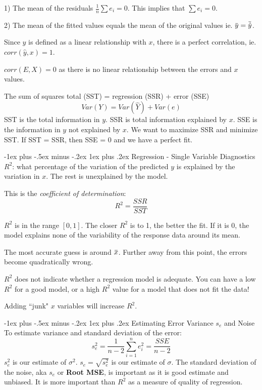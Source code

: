 \documentclass[10pt,landscape]{article}
\makeatletter
\renewcommand{\subsubsection}{\@startsection{subsubsection}{3}{0mm}%
                                {-1ex plus -.5ex minus -.2ex}%
                                {1ex plus .2ex}%
                                {\normalfont\small\bfseries}}
\newcommand{\overbar}[1]{\mkern 1.5mu\overline{\mkern-1.5mu#1\mkern-1.5mu}\mkern 1.5mu}
\makeatother
\begin{document}
\begin{multicols*}{3}
1) The mean of the residuals $\frac{1}{n} \sum e_i = 0$. This implies that $\sum e_i = 0$.

2) The mean of the fitted values equals the mean of the original values ie. $\overbar{y} = \overbar{\hat{y}}$.

Since $\hat{y}$ is defined as a linear relationship with $x$, there is a perfect correlation, ie. $corr(\hat{y}, x) = 1$.

$corr(E, X) = 0$ as there is no linear relationship between the errors and $x$ values.

The sum of squares total (SST) = regression (SSR) + error (SSE)
\[
Var(Y) = Var(\hat{Y}) + Var(e)
\]
SST is the total information in $y$. SSR is total information explained by $x$. SSE is the information in $y$ not explained by $x$. We want to maximize SSR and minimize SST. If SST = SSR, then SSE = 0 and we have a perfect fit.

\subsubsection{Regression - Single Variable Diagnostics}
$R^2$: what percentage of the variation of the predicted $y$  is explained by the variation in $x$. The rest is unexplained by the model.

This is the \textit{coefficient of determination}:
\[
R^2 = \frac{SSR}{SST}
\]

$R^2$ is in the range $[0,1]$. The closer $R^2$ is to 1, the better the fit. If it is 0, the model explains none of the variability of the response data around its mean.

The most accurate guess is around $\overbar{x}$. Further away from this point, the errors become quadratically wrong.

$R^2$ does not indicate whether a regression model is adequate. You can have a low $R^2$ for a good model, or a high $R^2$ value for a model that does not fit the data! 

Adding ``junk" $x$ variables will increase $R^2$.

\subsubsection{Estimating Error Variance $s_e$ and Noise}
To estimate variance and standard deviation of the error:
\[
s_e^2 = \frac{1}{n-2} \sum\limits_{i=1}^n e_i^2 = \frac{SSE}{n - 2}
\]
$s_e^2$ is our estimate of $\sigma^2$. $s_e = \sqrt{s_e^2}$ is our estimate of $\sigma$. The standard deviation of the noise, aka $s_e$ or \textbf{Root MSE}, is important as it is good estimate and unbiased. It is more important than $R^2$ as a measure of quality of regression.


\end{multicols*}
\end{document}
